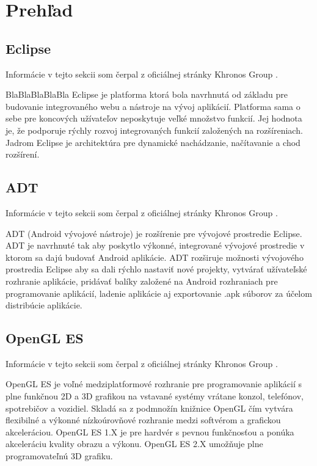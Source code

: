 \chapter{Prehľad}\label{chap:prehlad}

\section{Eclipse}

Informácie v tejto sekcii som čerpal z oficiálnej stránky Khronos Group \cite{fou}.

BlaBlaBlaBlaBla
Eclipse je platforma ktorá bola navrhnutá od základu pre budovanie integrovaného webu a nástroje na vývoj aplikácií. Platforma sama o sebe pre koncových užívateľov neposkytuje veľké množstvo funkcií. Jej hodnota je, že podporuje rýchly rozvoj integrovaných funkcií založených na rozšíreniach. Jadrom Eclipse je architektúra pre dynamické nachádzanie, načítavanie a chod rozšírení. 

\section{ADT}

Informácie v tejto sekcii som čerpal z oficiálnej stránky Khronos Group \cite{pro}.

ADT (Android vývojové nástroje) je rozšírenie pre vývojové prostredie Eclipse. ADT je navrhnuté tak aby poskytlo výkonné, integrované vývojové prostredie v ktorom sa dajú budovať Android aplikácie. ADT rozširuje možnosti vývojového prostredia Eclipse aby sa dali rýchlo nastaviť nové projekty, vytvárať užívateľské rozhranie aplikácie, pridávať balíky založené na Android rozhraniach pre programovanie aplikácií, ladenie aplikácie aj exportovanie .apk súborov za účelom distribúcie aplikácie.

\section{OpenGL ES}

Informácie v tejto sekcii som čerpal z oficiálnej stránky Khronos Group \cite{gro}.

OpenGL ES je voľné medziplatformové rozhranie pre programovanie aplikácií s plne funkčnou 2D a 3D grafikou na vstavané systémy vrátane konzol, telefónov, spotrebičov a vozidiel. Skladá sa z podmnožín knižnice OpenGL čím vytvára flexibilné a výkonné nízkoúrovňové rozhranie medzi softvérom a grafickou akceleráciou. OpenGL ES 1.X je pre hardvér s pevnou funkčnosťou a ponúka akceleráciu kvality obrazu a výkonu. OpenGL ES 2.X umožňuje plne programovateľnú 3D grafiku.

